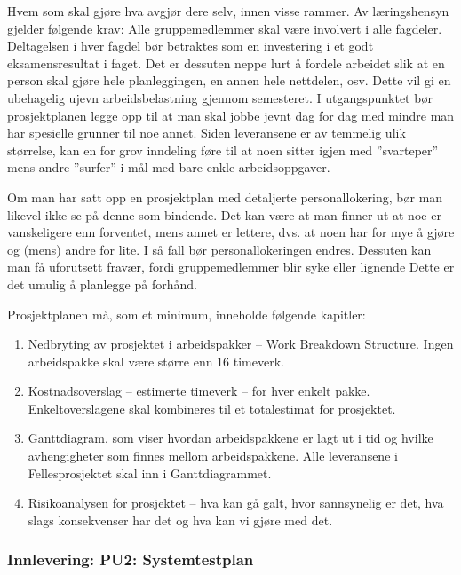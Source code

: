 Hvem som skal gjøre hva avgjør dere selv, innen visse rammer. Av læringshensyn gjelder følgende krav: Alle gruppemedlemmer skal være involvert i alle fagdeler. Deltagelsen i hver fagdel bør betraktes som en investering i et godt eksamensresultat i faget. Det er dessuten neppe lurt å fordele arbeidet slik at en person skal gjøre hele planleggingen, en annen hele nettdelen, osv. Dette vil gi en ubehagelig ujevn arbeidsbelastning gjennom semesteret. I utgangspunktet bør prosjektplanen legge opp til at man skal jobbe jevnt dag for dag med mindre man har spesielle grunner til noe annet. Siden leveransene er av temmelig ulik størrelse, kan en for grov inndeling føre til at noen sitter igjen med ”svarteper” mens andre ”surfer” i mål med bare enkle arbeidsoppgaver.

Om man har satt opp en prosjektplan med detaljerte personallokering, bør man likevel ikke se på denne som bindende. Det kan være at man finner ut at noe er vanskeligere enn forventet, mens annet er lettere, dvs. at noen har for mye å gjøre og (mens) andre for lite. I så fall bør personallokeringen endres. Dessuten kan man få uforutsett fravær, fordi gruppemedlemmer blir syke eller lignende Dette er det umulig å planlegge på forhånd.

Prosjektplanen må, som et minimum, inneholde følgende kapitler:

\begin{enumerate}

\item
Nedbryting av prosjektet i arbeidspakker – Work Breakdown Structure. Ingen arbeidspakke skal være større enn 16 timeverk.

\item
Kostnadsoverslag – estimerte timeverk – for hver enkelt pakke. Enkeltoverslagene skal kombineres til et totalestimat for prosjektet.

\item
Ganttdiagram, som viser hvordan arbeidspakkene er lagt ut i tid og hvilke avhengigheter som finnes mellom arbeidspakkene. Alle leveransene i Fellesprosjektet skal inn i Ganttdiagrammet. 

\item
Risikoanalysen for prosjektet – hva kan gå galt, hvor sannsynelig er det, hva slags konsekvenser har det og hva kan vi gjøre med det.

\end{enumerate}

\subsubsection{Innlevering: PU2: Systemtestplan}

